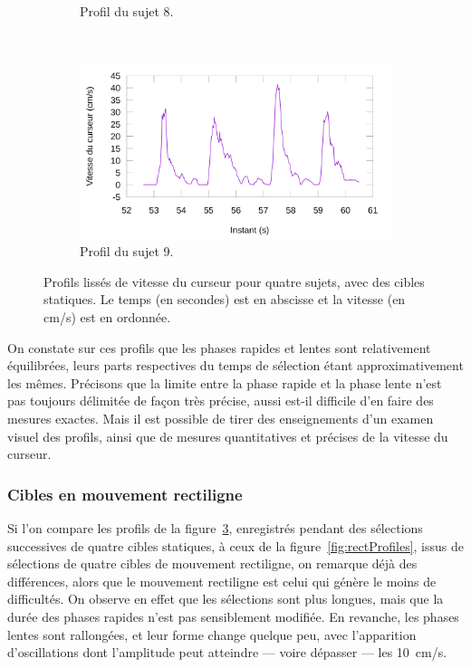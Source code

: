 \begin{figure}[htb]
\begin{subfigure}[t]{\subImgWlineplot}
			\caption{Profil du sujet 8.}
			\label{fig:staticProfile8}
		\end{subfigure}
		~
		\begin{subfigure}[t]{\subImgWlineplot}
			\centering
			\includegraphics[width=\textwidth]{figures/ch4/subject_09_static_condition_smoothed}
			\caption{Profil du sujet 9.}
			\label{fig:staticProfile9}
		\end{subfigure}
		\caption[Profils de vitesse du curseur, cibles statiques]{Profils lissés de vitesse du curseur pour quatre sujets, avec des cibles statiques. Le temps (en secondes) est en abscisse et la vitesse (en cm/s) est en ordonnée.}
		\label{fig:staticProfiles}
	\end{figure}
	
	On constate sur ces profils que les phases rapides et lentes sont relativement équilibrées, leurs parts respectives du temps de sélection étant approximativement les mêmes. Précisons que la limite entre la phase rapide et la phase lente n'est pas toujours délimitée de façon très précise, aussi est-il difficile d'en faire des mesures exactes. Mais il est possible de tirer des enseignements d'un examen visuel des profils, ainsi que de mesures quantitatives et précises de la vitesse du curseur.
	
	\subsubsection{Cibles en mouvement rectiligne}
	Si l'on compare les profils de la figure~\ref{fig:staticProfiles}, enregistrés pendant des sélections successives de quatre cibles statiques, à ceux de la figure~\ref{fig:rectProfiles}, issus de sélections de quatre cibles de mouvement rectiligne, on remarque déjà des différences, alors que le mouvement rectiligne est celui qui génère le moins de difficultés. On observe en effet que les sélections sont plus longues, mais que la durée des phases rapides n'est pas sensiblement modifiée. En revanche, les phases lentes sont rallongées, et leur forme change quelque peu, avec l'apparition d'oscillations dont l'amplitude peut atteindre --- voire dépasser --- les 10~cm/s.
	
